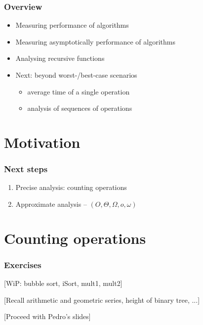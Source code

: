 \documentclass[aspectratio=169]{beamer}
\begin{document}
\frame[plain]{\titlepage}


\begin{frame}[t]\frametitle{Overview}

  \begin{itemize}
    \item Measuring  performance of algorithms
    \item Measuring \alert{asymptotically} performance of algorithms
    \item Analysing recursive functions
    \item Next: beyond worst-/best-case scenarios
          \begin{itemize}
            \item average time of a single operation
            \item analysis of sequences of operations
          \end{itemize}
  \end{itemize}
    
\end{frame}

\section{Motivation}



\begin{frame}\frametitle{Next steps}
  \begin{enumerate}
    \item Precise analysis: \alert{counting operations}
    \item Approximate analysis -- $(O, \Theta, \Omega, o, \omega)$
  \end{enumerate}
\end{frame}

\section{Counting operations}

\begin{frame}[t]\frametitle{Exercises}
  [WiP: bubble sort, iSort, mult1, mult2]

  [Recall arithmetic and geometric series, height of binary tree, ...]

  [Proceed with Pedro's slides]
\end{frame}
\end{document}
